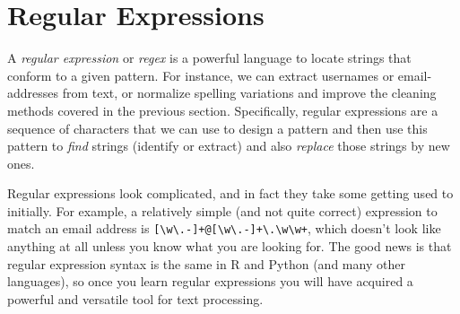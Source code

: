 %

\section{Regular Expressions}
\label{sec:regular}

A \emph{regular expression} or \emph{regex} is a powerful language to locate strings that conform to a given pattern. For instance, we can extract usernames or email-addresses from text, or normalize spelling variations and improve the cleaning methods covered in the previous section. Specifically, regular expressions are a sequence of characters that we can use to design a pattern and then use this pattern to \emph{find} strings (identify or extract) and also \emph{replace} those strings by new ones.

Regular expressions look complicated, and in fact they take some getting used to initially.
For example, a relatively simple (and not quite correct) expression to match an email address is \verb|[\w\.-]+@[\w\.-]+\.\w\w+|,
which doesn't look like anything at all unless you know what you are looking for.
The good news is that regular expression syntax is the same in R and Python (and many other languages),
so once you learn regular expressions you will have acquired a powerful and versatile tool for text processing.




